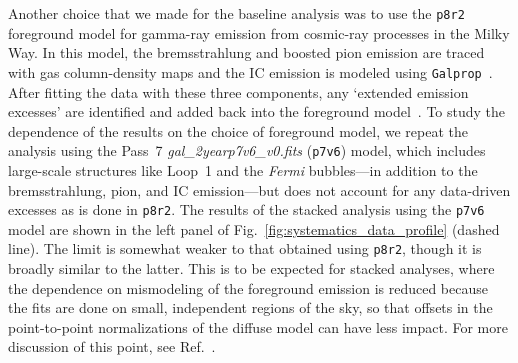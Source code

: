 Another choice that we made for the baseline analysis was to use the \texttt{p8r2} foreground model for gamma-ray emission from cosmic-ray processes in the Milky Way.   In this model, the bremsstrahlung and boosted pion emission are traced with gas column-density maps and the IC emission is modeled using \texttt{Galprop}~\cite{Strong:2007nh}.  After fitting the data with these three components, any `extended emission excesses' are identified and added back into the foreground model~\cite{Acero:2016qlg}.  To study the dependence of the results on the choice of foreground model, we repeat the analysis using the Pass~7 \emph{gal\_2yearp7v6\_v0.fits} (\texttt{p7v6}) model, which includes large-scale structures like Loop~1 and the \emph{Fermi} bubbles---in addition to the bremsstrahlung, pion, and IC emission---but does not account for any data-driven excesses as is done in \texttt{p8r2}.  The results of the stacked analysis using the \texttt{p7v6} model are shown in the left panel of Fig.~\ref{fig:systematics_data_profile} (dashed line).  The limit is somewhat weaker to that obtained using \texttt{p8r2}, though it is broadly similar to the latter.  This is to be expected for stacked analyses, where the dependence on mismodeling of the foreground emission is reduced because the fits are done on small, independent regions of the sky, so that offsets in the point-to-point normalizations of the diffuse model can have less impact. For more discussion of this point, see Ref.~\cite{Daylan:2014rsa,Linden:2016rcf,Narayanan:2016nzy,Cohen:2016uyg}.\vspace{0.1in}

